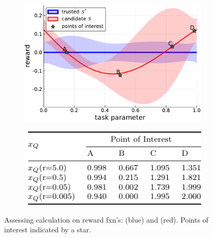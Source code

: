 \begin{figure}[tbp]
    \centering
    \begin{subfigure}[c]{0.65\linewidth}
        \centering
        \includegraphics[width=1.0\linewidth]{Figures/p1.pdf}
        \vfill
    \end{subfigure}%
    \hfill
    \begin{subfigure}[t]{0.35\linewidth}
        \centering
        \includegraphics[width=1.0\linewidth]{Figures/p1_table.pdf}
    \end{subfigure} 
    \caption{Assessing \xQ{} calculation on reward fxn's: \solvestar{} (blue) and \solve{} (red). Points of interest indicated by a star.}
    \label{fig:sq_thry1}
    \vspace{-0.4cm}
\end{figure}

